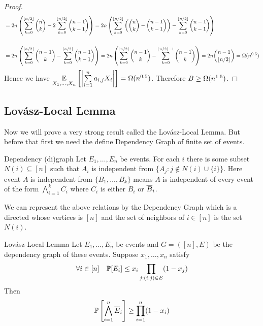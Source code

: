 \documentclass[twoside]{article}
\begin{document}
\begin{proof}
\begin{align*}
		&=2n\left(\sum_{k=0}^{\lfloor n/2\rfloor}\binom{n}k-2\sum_{k=0}^{\lfloor n/2\rfloor}\binom{n-1}{k-1}\right)=2n\left(\sum_{k=0}^{\lfloor n/2\rfloor}\left(\binom{n}k-\binom{n-1}{k-1}\right)-\sum_{k=0}^{\lfloor n/2\rfloor}\binom{n-1}{k-1}\right)\\\\
		&=2n\left(\sum_{k=0}^{\lfloor n/2\rfloor}\binom{n-1}k-\sum_{k=0}^{\lfloor n/2\rfloor}\binom{n-1}{k-1}\right)=2n\left(\sum_{k=0}^{\lfloor n/2\rfloor}\binom{n-1}k-\sum_{k=0}^{\lfloor n/2\rfloor-1}\binom{n-1}k\right)=2n\binom{n-1}{\lfloor n/2\rfloor}=\Omega(n^{0.5})
	\end{align*}Hence we have $\underset{X_1,\dots, X_n}{\mathbb{E}}\left[ \left|\sum\limits_{i=1}^na_{i,j}X_i \right| \right]=\Omega(n^{0.5})$. Therefore $B\geq \Omega(n^{1.5})$.
\end{proof}
\subsection{Lov\'{a}sz-Local Lemma}
Now we will prove a very strong result called the Lov\'{a}sz-Local Lemma. But before that first we need the define Dependency Graph of finite set of events.
\begin{Definition}{Dependency (di)graph}{}
	Let $E_1,\dots, E_n$ be events. For each $i$ there is some subset $N(i)\subseteq [n]$ such that $A_i$ is independent from $\{A_j\colon j\notin N(i)\cup \{i\}\}$. Here event $A$ is independent from $\{B_1,\dots, B_k\}$ means $A$ is independent of every event of the form $\bigwedge\limits_{i=1}^kC_i$ where $C_i$ is either $B_i$ or $\overline{B}_i$.\parinn
	
	We can represent the above relations by the Dependency Graph which is a directed whose vertices is $[n]$ and the set of neighbors of $i\in[n]$  is the set $N(i)$.
\end{Definition}
\begin{Theorem}{Lov\'{a}sz-Local Lemma}{}
	Let $E_1,\dots, E_n$ be events and $G=([n],E)$ be the dependency graph of these events. Suppose $x_1,\dots, x_n$ satisfy $$\forall i\in[n]\quad \mathbb{P}[E_i]\leq x_i\prod_{j:(i,j)\in E}(1-x_j)$$Then $$\mathbb{P}\left[\bigwedge_{i=1}^n\overline{E}_i\right]\geq \prod_{i=1}^n(1-x_i)$$
\end{Theorem}
\end{document}
